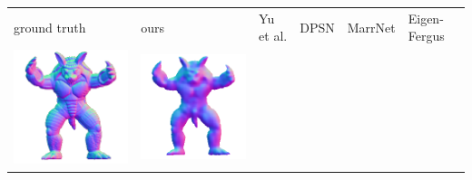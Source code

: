 \begin{center}
\begin{tabularx}{\linewidth}{@{}Y@{}Y@{}Y@{}Y@{}Y@{}Y@{}}
ground truth & ours & Yu et al. & DPSN & MarrNet & Eigen-Fergus \\
\includegraphics[width=\linewidth]{semisynthetic/20150514_22_gt.png} &
\includegraphics[width=\linewidth]{semisynthetic/20150514_22_ours_out.png} &

\end{tabularx}
\end{center}
